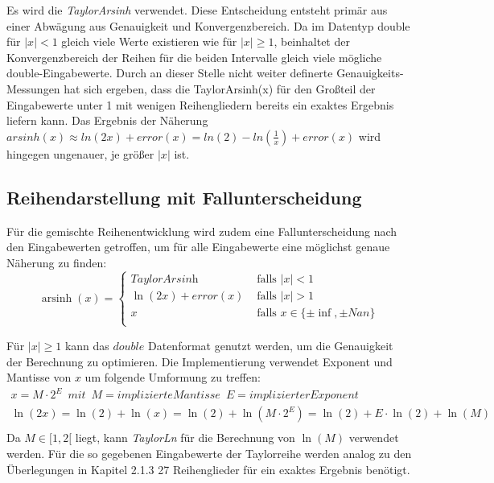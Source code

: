 \documentclass[course=erap] {aspdoc}
\begin{document}
    Es wird die \textit{TaylorArsinh} verwendet.
    Diese Entscheidung entsteht primär aus einer Abwägung aus Genauigkeit und Konvergenzbereich.
    Da im Datentyp double für $|x|<1$ gleich viele Werte existieren wie für $|x|\geq1$, beinhaltet der Konvergenzbereich der Reihen für die beiden Intervalle gleich viele mögliche double-Eingabewerte.
    Durch an dieser Stelle nicht weiter definerte Genauigkeits-Messungen hat sich ergeben, dass die TaylorArsinh(x) für den Großteil der Eingabewerte unter 1 mit wenigen Reihengliedern bereits ein exaktes Ergebnis liefern kann.
    Das Ergebnis der Näherung $ arsinh(x)\approx ln(2x) + error(x) = ln(2) - ln(\frac{1}{x}) + error(x)$ wird hingegen ungenauer, je größer $|x|$ ist.

    \subsection{Reihendarstellung mit Fallunterscheidung}\label{subsec:reihendarstellung-mit-fallunterscheidung}

    Für die gemischte Reihenentwicklung wird zudem eine Fallunterscheidung nach den Eingabewerten getroffen, um für alle Eingabewerte eine möglichst genaue Näherung zu finden:
    \[ \operatorname{arsinh}(x) =
    \begin{cases}
        \textit{TaylorArsinh}     & \text{ falls } |x| < 1 \\
        \ln(2x) + error(x)  & \text{ falls } |x| >1 \\
        x     & \text{ falls } x \in \{\pm\inf, \pm Nan\}\\
    \end{cases}\]

    Für $|x|\geq1$ kann das $double$ Datenformat genutzt werden, um die Genauigkeit der Berechnung zu optimieren.
    Die Implementierung verwendet Exponent und Mantisse von $x$ um folgende Umformung zu treffen:
    \begin{gather*}
        x = M\cdot2^E \,\,\, mit \,\,\, M = implizierte Mantisse \,\,\, E = implizierter Exponent\\
        \ln(2x) = \ln(2) + \ln(x) = \ln(2) + \ln(M\cdot2^E) = \ln(2) + E\cdot\ln(2) + \ln(M)\\
    \end{gather*}
    Da $M\in[1, 2[$ liegt, kann \textit{TaylorLn} für die Berechnung von $\ln(M)$ verwendet werden.
    Für die so gegebenen Eingabewerte der Taylorreihe werden analog zu den Überlegungen in Kapitel 2.1.3 27 Reihenglieder für ein exaktes Ergebnis benötigt.
\end{document}

